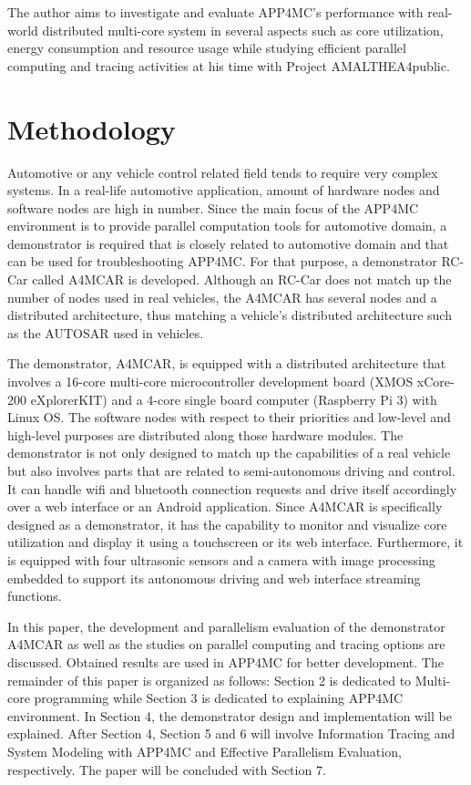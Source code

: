 The author aims to investigate and evaluate APP4MC's performance with real-world distributed multi-core system in several aspects such as core utilization, energy consumption and resource usage while studying efficient parallel computing and tracing activities at his time with Project AMALTHEA4public.

\section{Methodology}

Automotive or any vehicle control related field tends to require very complex systems. In a real-life automotive application, amount of hardware nodes and software nodes are high in number. Since the main focus of the APP4MC environment is to provide parallel computation tools for automotive domain, a demonstrator is required that is closely related to automotive domain and that can be used for troubleshooting APP4MC. For that purpose, a demonstrator RC-Car called A4MCAR is developed. Although an RC-Car does not match up the number of nodes used in real vehicles, the A4MCAR has several nodes and a distributed architecture, thus matching a vehicle's distributed architecture such as the AUTOSAR used in vehicles.

The demonstrator, A4MCAR, is equipped with a distributed architecture that involves a 16-core multi-core microcontroller development board (XMOS xCore-200 eXplorerKIT) and a 4-core single board computer (Raspberry Pi 3) with Linux OS. The software nodes with respect to their priorities and low-level and high-level purposes are distributed along those hardware modules. The demonstrator is not only designed to match up the capabilities of a real vehicle but also involves parts that are related to semi-autonomous driving and control. It can handle wifi and bluetooth connection requests and drive itself accordingly over a web interface or an Android application. Since A4MCAR is specifically designed as a demonstrator, it has the capability to monitor and visualize core utilization and display it using a touchscreen or its web interface. Furthermore, it is equipped with four ultrasonic sensors and a camera with image processing embedded to support its autonomous driving and web interface streaming functions.

In this paper, the development and parallelism evaluation of the demonstrator A4MCAR as well as the studies on parallel computing and tracing options are discussed. Obtained results are used in APP4MC for better development. The remainder of this paper is organized as follows: Section 2 is dedicated to Multi-core programming while Section 3 is dedicated to explaining APP4MC environment. In Section 4, the demonstrator design and implementation will be explained. After Section 4, Section 5 and 6 will involve Information Tracing and System Modeling with APP4MC and Effective Parallelism Evaluation, respectively. The paper will be concluded with Section 7.

